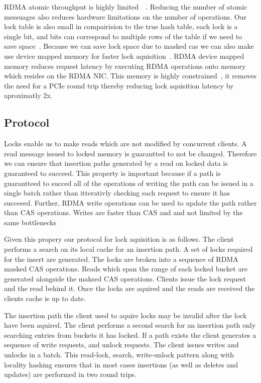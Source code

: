 RDMA atomic throughput is highly
limited~\cite{design-guidelines}~\todo{[swordbox]}. Reducing
the number of atomic messuages also reduces hardware
limitations on the number of operations. Our lock table is
also small in compairision to the true hash table, each lock
is a single bit, and bits can correspond to multiple rows of
the table if we need to save space~. Because we can save lock space due to
masked cas we can also make use device mapped memory for
faster lock aquisition~\cite{sherman}. RDMA device mapped
memory reduces request latency by executing RDMA operations
onto memory which resides on the RDMA NIC. This memory is
highly constrained~, it removes the need
for a PCIe round trip thereby reducing lock aquisition
latency by aproximatly 2x.


\subsection{Protocol}

Locks enable us to make reads which are not modified by
concurrent clients. A read message issued to locked memory
is guarantted to not be changed. Therefore we can ensure
that insertion paths generated by a read on locked data is
guaranteed to succeed. This property is important because if
a path is guarantteed to succed all of the operations of
writing the path can be issued in a single batch rather than
itterativly checking each request to ensure it has succeeed.
Further, RDMA write operations can be used to update the
path rather than CAS operations. Writes are faster than CAS
and and not limited by the same bottlenecks~

Given this propery our protocol for lock aquisition is as
follows. The client performs a search on its local cache for
an insertion path. A set of locks required for the insert
are generated. The locks are broken into a sequence of RDMA
masked CAS operations. Reads which span the range of each
locked bucket are generated alongside the maksed CAS
operations. Clients issue the lock request and the read
behind it. Once the locks are aquired and the reads are
received the clients cache is up to date.

The insertion path the client used to aquire locks may be
invalid after the lock have been aquired. The client
performs a second search for an insertion path only
searching entries from buckets it has locked. If a path
exists the client generates a sequence of write requests,
and unlock requests. The client issues writes and unlocks in
a batch. This read-lock, search, write-unlock pattern along
with locality hashing ensures that in most cases insertions
(as well as deletes and updates) are performed in two round
trips.


